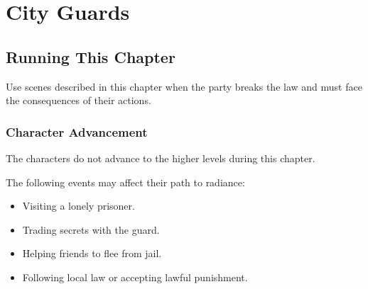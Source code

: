 \chapter{City Guards}
\label{chap:chapterGuards}

\setcounter{section}{-1}
\section{Running This Chapter}

Use scenes described in this chapter when the party breaks the law and must face the consequences of their actions.

\subsection{Character Advancement}

The characters do not advance to the higher levels during this chapter.

The following events may affect their path to radiance:
\begin{itemize}
	\item Visiting a lonely prisoner.
	\item Trading secrets with the guard.
	\item Helping friends to flee from jail.
	\item Following local law or accepting lawful punishment.
\end{itemize}


 
 


